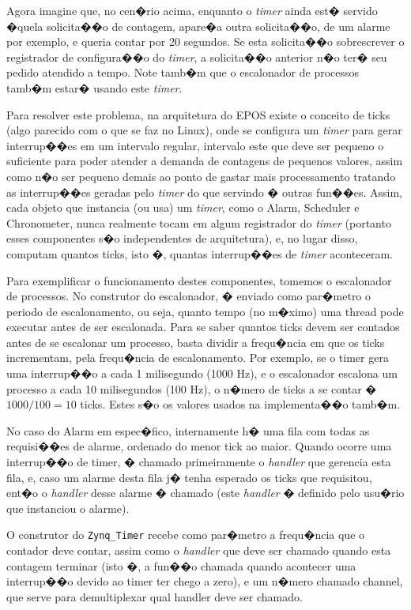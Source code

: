 \documentclass{ufscThesis/ufscThesis} %
\begin{document}
Agora imagine que, no cen�rio acima, enquanto o \emph{timer} ainda est� servido �quela solicita��o de contagem, apare�a outra solicita��o, de um alarme por exemplo, e queria contar por 20 segundos. Se esta solicita��o sobrescrever o registrador de configura��o do \emph{timer}, a solicita��o anterior n�o ter� seu pedido atendido a tempo. Note tamb�m que o escalonador de processos tamb�m estar� usando este \emph{timer}.

Para resolver este problema, na arquitetura do EPOS existe o conceito de ticks (algo parecido com o que se faz no Linux), onde se configura um \emph{timer} para gerar interrup��es em um intervalo regular, intervalo este que deve ser pequeno o suficiente para poder atender a demanda de contagens de pequenos valores, assim como n�o ser pequeno demais ao ponto de gastar mais processamento tratando as interrup��es geradas pelo \emph{timer} do que servindo � outras fun��es. Assim, cada objeto que instancia (ou usa) um \emph{timer}, como o Alarm, Scheduler e Chronometer, nunca realmente tocam em algum registrador do \emph{timer} (portanto esses componentes s�o independentes de arquitetura), e, no lugar disso, computam quantos ticks, isto �, quantas interrup��es de \emph{timer} aconteceram.

Para exemplificar o funcionamento destes componentes, tomemos o escalonador de processos. No construtor do escalonador, � enviado como par�metro o periodo de escalonamento, ou seja, quanto tempo (no m�ximo) uma thread pode executar antes de ser escalonada. Para se saber quantos ticks devem ser contados antes de se escalonar um processo, basta dividir a frequ�ncia em que os ticks incrementam, pela frequ�ncia de escalonamento. Por exemplo, se o timer gera uma interrup��o a cada 1 milisegundo (1000 Hz), e o escalonador escalona um processo a cada 10 milisegundos (100 Hz), o n�mero de ticks a se contar � $1000/100 = 10$ ticks. Estes s�o os valores usados na implementa��o tamb�m.

No caso do Alarm em espec�fico, internamente h� uma fila com todas as requisi��es de alarme, ordenado do menor tick ao maior. Quando ocorre uma interrup��o de timer, � chamado primeiramente o \emph{handler} que gerencia esta fila, e, caso um alarme desta fila j� tenha esperado os ticks que requisitou, ent�o o \emph{handler} desse alarme � chamado (este \emph{handler} � definido pelo usu�rio que instanciou o alarme).


O construtor do \verb+Zynq_Timer+ recebe como par�metro a frequ�ncia que o contador deve contar, assim como o \emph{handler} que deve ser chamado quando esta contagem terminar (isto �, a fun��o chamada quando acontecer uma interrup��o devido ao timer ter chego a zero), e um n�mero chamado channel, que serve para demultiplexar qual handler deve ser chamado.
\end{document}
